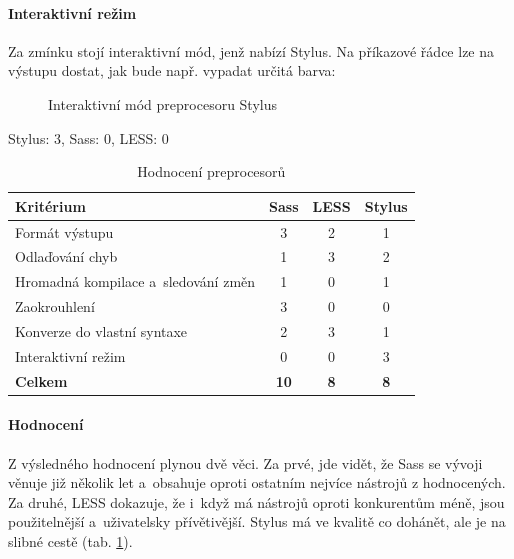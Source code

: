 \documentclass[thesis=B,czech]{FITthesis}[2012/06/26]
\begin{document}
\paragraph{Interaktivní režim}

 Za zmínku stojí interaktivní mód, jenž nabízí Stylus. Na příkazové řádce lze na výstupu dostat, jak bude např. vypadat určitá barva:
\begin{figure}[h]
	\begin{center}
	\end{center}
	\caption{Interaktivní mód preprocesoru Stylus}
	\label{imgStyl2}
\end{figure}

Stylus: 3, Sass: 0, LESS: 0



\begin{table}\centering
 	\caption[Hodnocení preprocesorů]{Hodnocení preprocesorů}\label{tab:pre}
 	\begin{tabular}{|l|c|c|c|}\hline
	\textbf{Kritérium} & \textbf{Sass} & \textbf{LESS} & \textbf{Stylus} \tabularnewline	
 	\hline\hline
		 Formát výstupu & 3 & 2 & 1\tabularnewline\hline
		 Odlaďování chyb & 1 & 3 & 2\tabularnewline\hline
		 Hromadná kompilace a~sledování změn & 1 & 0 & 1\tabularnewline\hline
		 Zaokrouhlení & 3 & 0 & 0\tabularnewline\hline
		 Konverze do vlastní syntaxe & 2 & 3 & 1\tabularnewline\hline
		 Interaktivní režim  & 0 & 0 & 3\tabularnewline\hline
		 \textbf{Celkem} & \textbf{10} & \textbf{8} & \textbf{8}\tabularnewline\hline
 	\end{tabular}
\end{table} 


\paragraph{Hodnocení}

Z výsledného hodnocení plynou dvě věci. Za prvé, jde vidět, že Sass se vývoji věnuje již několik let a~obsahuje oproti ostatním nejvíce nástrojů z hodnocených. Za druhé, LESS dokazuje, že i~když má nástrojů oproti konkurentům méně, jsou použitelnější a~uživatelsky přívětivější. Stylus má ve kvalitě co dohánět, ale je na slibné cestě (tab. \ref{tab:pre}).
\end{document}
